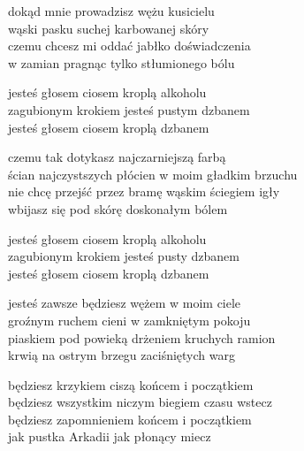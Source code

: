 \begin{text}
    dokąd mnie prowadzisz wężu kusicielu\\
    wąski pasku suchej karbowanej skóry\\
    czemu chcesz mi oddać jabłko doświadczenia\\
    w zamian pragnąc tylko stłumionego bólu

    jesteś głosem ciosem kroplą alkoholu\\
    zagubionym krokiem jesteś pustym dzbanem\\
    jesteś głosem ciosem kroplą dzbanem

    czemu tak dotykasz najczarniejszą farbą\\
    ścian najczystszych płócien w moim gładkim brzuchu\\
    nie chcę przejść przez bramę wąskim ściegiem igły\\
    wbijasz się pod skórę doskonałym bólem

    jesteś głosem ciosem kroplą alkoholu\\
    zagubionym krokiem jesteś pusty dzbanem\\
    jesteś głosem ciosem kroplą dzbanem

    jesteś zawsze będziesz wężem w moim ciele\\
    groźnym ruchem cieni w zamkniętym pokoju\\
    piaskiem pod powieką drżeniem kruchych ramion\\
    krwią na ostrym brzegu zaciśniętych warg

    będziesz krzykiem ciszą końcem i początkiem\\
    będziesz wszystkim niczym biegiem czasu wstecz\\
    będziesz zapomnieniem końcem i początkiem\\
    jak pustka Arkadii jak płonący miecz
\end{text}
\begin{chord}

\end{chord}